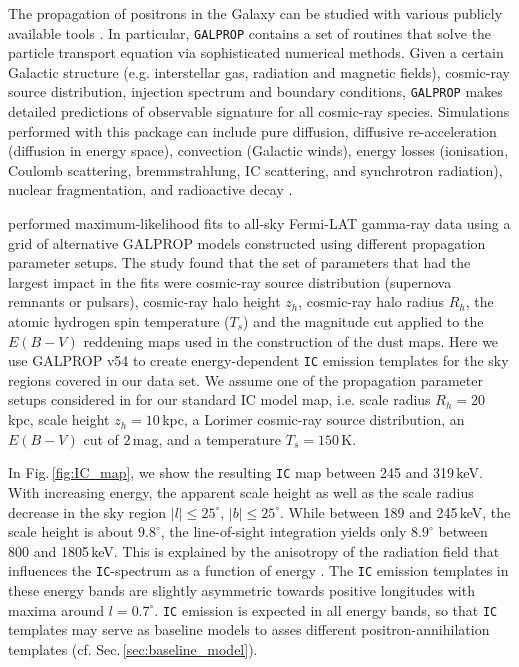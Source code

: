 \documentclass[doublespace,nopageskip]{VTthesis} %
\begin{document}
\begin{appendices}
	The propagation of positrons in the Galaxy can be studied with various publicly available tools \cite[e.g., \texttt{GALPROP} or \texttt{DRAGON},][]{Strong2007_GALPROP,Evoli2008_CRdiffuse}.
	In particular, \texttt{GALPROP} contains a set of routines that solve the particle transport equation via sophisticated numerical methods.
	Given a certain Galactic structure (e.g. interstellar gas, radiation and magnetic fields), cosmic-ray source distribution, injection spectrum and boundary conditions, \texttt{GALPROP} makes detailed predictions of observable signature for all cosmic-ray species.
	Simulations performed with this package can include pure diffusion, diffusive re-acceleration (diffusion in energy space), convection (Galactic winds),  energy losses (ionisation, Coulomb scattering, bremmstrahlung, IC scattering, and synchrotron radiation), nuclear fragmentation, and radioactive decay \citep{Moskalenko2005_CRprop}.
	
	\citet{Ackermann2012_FermiLATGeV} performed maximum-likelihood fits to all-sky Fermi-LAT gamma-ray data using a grid of alternative GALPROP models constructed using different propagation parameter setups.
	The study found that the set of parameters that had the largest impact in the fits were cosmic-ray source distribution (supernova remnants or pulsars), cosmic-ray halo height $z_h$, cosmic-ray halo radius $R_h$, the atomic hydrogen spin temperature ($T_s$) and the magnitude cut applied to the $E(B-V)$ reddening maps used in the construction of the dust maps.
	Here we use GALPROP v54 \citep{Strong2007_GALPROP} to create energy-dependent \texttt{IC} emission templates for the sky regions covered in our data set.
	We assume one of the propagation parameter setups considered in \citep{Ackermann2012_FermiLATGeV} for our standard IC model map, i.e. scale radius $R_h = 20$\,kpc, scale height $z_h = 10$\,kpc, a Lorimer cosmic-ray source distribution, an $E(B-V)$ cut of $2$\,mag, and a temperature $T_s = 150$\,K.
	
	In Fig.\,\ref{fig:IC_map}, we show the resulting \texttt{IC} map between 245 and 319\,keV.
	With increasing energy, the apparent scale height as well as the scale radius decrease in the sky region $|l|\leq25^{\circ}$, $|b|\leq25^{\circ}$.
	While between 189 and 245\,keV, the scale height is about $9.8^{\circ}$, the line-of-sight integration yields only $8.9^{\circ}$ between 800 and 1805\,keV.
	This is explained by the anisotropy of the radiation field that influences the \texttt{IC}-spectrum as a function of energy \citep{Moskalenko2000_IC}.
	The \texttt{IC} emission templates in these energy bands are slightly asymmetric towards positive longitudes with maxima around $l=0.7^{\circ}$.
	\texttt{IC} emission is expected in all energy bands, so that \texttt{IC} templates may serve as baseline models to asses different positron-annihilation templates (cf. Sec.\,\ref{sec:baseline_model}).
	

\end{appendices}
\end{document}
